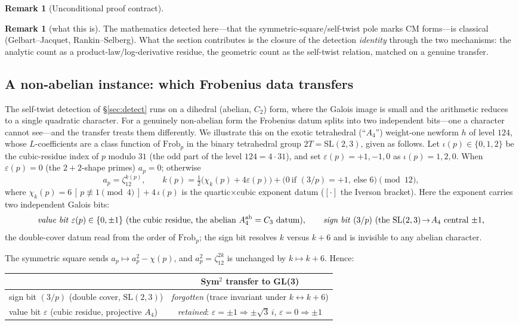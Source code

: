 \documentclass[11pt]{article}
\theoremstyle{definition}
\newtheorem{remark}[theorem]{Remark}
\begin{document}
\begin{remark}[Unconditional proof contract]
\begin{enumerate}
\begin{remark}[what this is]
The mathematics detected here---that the symmetric-square/self-twist pole marks CM forms---is
classical (Gelbart--Jacquet, Rankin--Selberg). What the section contributes is the closure of the
detection \emph{identity} through the two mechanisms: the analytic count as a product-law/log-derivative residue, the geometric count as the self-twist relation, matched on a genuine transfer.
\end{remark}

\subsection{A non-abelian instance: which Frobenius data transfers}\label{sec:a4}

The self-twist detection of \S\ref{sec:detect} runs on a dihedral (abelian, $C_2$) form, where the
Galois image is small and the arithmetic reduces to a single quadratic character. For a genuinely
non-abelian form the Frobenius datum splits into two independent bits---one a character cannot
see---and the transfer treats them differently. We illustrate this on the exotic tetrahedral
(``$A_4$'') weight-one newform $h$ of level $124$, whose $L$-coefficients are a class function of
$\mathrm{Frob}_p$ in the binary tetrahedral group $2T=\mathrm{SL}(2,3)$, given as follows. Let $\iota(p)\in\{0,1,2\}$ be the cubic-residue index of $p$ modulo $31$ (the odd part of the
level $124=4\cdot31$), and set $\varepsilon(p)=+1,-1,0$ as $\iota(p)=1,2,0$. When $\varepsilon(p)=0$ (the
$2{+}2$-shape primes) $a_p=0$; otherwise
\[
  a_p=\zeta_{12}^{k(p)},\qquad
  k(p)=\tfrac12\big(\chi_k(p)+4\varepsilon(p)\big)+\big(0\ \text{if }(3/p)=+1,\ \text{else }6\big)\pmod{12},
\]
where $\chi_k(p)=6\,[\,p\not\equiv1\!\!\pmod 4\,]+4\,\iota(p)$ is the quartic$\times$cubic exponent datum
($[\cdot]$ the Iverson bracket). Here the exponent carries two independent Galois bits:
\[
  \text{\emph{value bit}}\ \varepsilon(p)\in\{0,\pm1\}\ \text{(the cubic residue, the abelian
  $A_4^{\mathrm{ab}}=C_3$ datum)},\qquad
  \text{\emph{sign bit}}\ (3/p)\ \text{(the $\mathrm{SL}(2,3)\!\to\!A_4$ central $\pm1$,}
\]
the double-cover datum read from the order of $\mathrm{Frob}_p$; the sign bit resolves $k$ versus
$k+6$ and is invisible to any abelian character.

The symmetric square sends $a_p\mapsto a_p^2-\chi(p)$, and $a_p^2=\zeta_{12}^{2k}$ is unchanged by
$k\mapsto k+6$. Hence:

\begin{center}
\begin{tabular}{lc}
\toprule
 & Sym$^2$ transfer to GL(3) \\
\midrule
sign bit $(3/p)$ (double cover, $\mathrm{SL}(2,3)$) & \emph{forgotten} (trace invariant under $k\!\leftrightarrow\!k{+}6$) \\
value bit $\varepsilon$ (cubic residue, projective $A_4$) & \emph{retained}: $\varepsilon=\pm1\Rightarrow\pm\sqrt3\,i$, $\varepsilon=0\Rightarrow\pm1$ \\
\bottomrule
\end{tabular}
\end{center}


\end{enumerate}
\end{remark}
\end{document}
